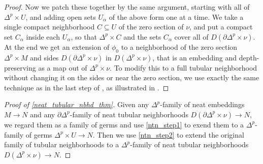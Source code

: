 \documentclass[11pt]{amsart}
\theoremstyle{definition}
\numberwithin{equation}{section}
\numberwithin{figure}{section}
\newcommand{\R}{\mathbb R}
\begin{document}
\begin{proof}
%	
%	
	
	Now we patch these together by the same argument, starting with all of $\Delta^p \times U$, and adding open sets $U_\alpha$ of the above form one at a time. We take a single compact neighborhood $C \subseteq U$ of the zero section of $\nu$, and put a compact set $C_\alpha$ inside each $U_\alpha$, so that $\Delta^p \times C$ and the sets $C_\alpha$ cover all of $D(\partial\Delta^p \times \nu)$. At the end we get an extension of $\phi_0$ to a neighborhood of the zero section $\Delta^p \times M$ and sides $D(\partial\Delta^p \times \nu)$ in $D(\Delta^p \times \nu)$, that is an embedding and depth-preserving as a map out of $\Delta^p \times \nu$. To modify this to a full tubular neighborhood without changing it on the sides or near the zero section, we use exactly the same technique as in the last step of \cite[Prop 2.43]{GIMM1}, as illustrated in \cite[Fig 8]{GIMM1}.
\end{proof}

\begin{proof}[Proof of \autoref{neat_tubular_nbhd_thm}]
	Given any $\Delta^p$-family of neat embeddings $M \to N$ and any $\partial \Delta^p$-family of neat tubular neighborhoods $D(\partial \Delta^p \times \nu) \to N$, we regard them as a family of germs and use \autoref{ntn_step1} to exend them to a $\Delta^p$-family of germs $\Delta^p \times U \to N$. Then we use \autoref{ntn_step2} to extend the original family of tubular neighborhoods to a $\Delta^p$-family of neat tubular neighborhoods $D(\Delta^p \times \nu) \to N$.
\end{proof}
\end{document}
